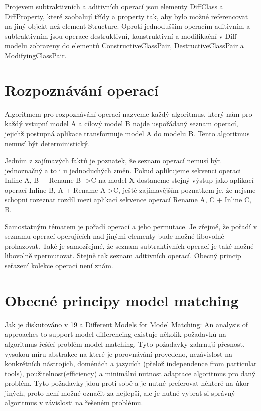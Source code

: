 \documentclass[11pt,twoside,a4paper]{book}
\begin{document}
 Projevem subtraktivních a aditivních operací jsou elementy DiffClass a
 DiffProperty, které zaobalují třídy a property tak, aby bylo možné referencovat
 na jiný objekt než element Structure. Oproti jednodušším operacím aditivním a
 subtraktivním jsou operace destruktivní, konstruktivní a modifikační v Diff
 modelu zobrazeny do elementů ConstructiveClassPair, DestructiveClassPair a
 ModifyingClassPair. 

\section{Rozpoznávání operací}

Algoritmem pro rozpoznávání operací nazveme každý algoritmus, který nám pro
každý vstupní model A a cílový model B najde uspořádaný seznam operací, jejichž
postupná aplikace transformuje model A do modelu B. Tento algoritmus nemusí být
deterministický.

Jedním z zajímavých faktů je poznatek, že seznam operací nemusí být jednoznačný
a to i u jednoduchých změn. Pokud aplikujeme sekvenci operaci Inline A, B + 
Rename B ->C na model X dostaneme stejný výstup jako aplikací operací Inline B,
A + Rename A->C, ještě zajímavějším poznatkem je, že nejsme schopni rozeznat
rozdíl mezi aplikací sekvence operací Rename A, C + Inline C, B.

Samostatným tématem je pořadí operací a jeho permutace. Je zřejmé, že pořadí v
seznamu operací operujících nad jinými elementy bude možné libovolně prohazovat.
Také je samozřejmé, že seznam subtraktivních operací je také možné libovolně
zpermutovat. Stejně tak seznam aditivních operací. Obecný princip seřazení kolekce 
operací není znám.

\section{Obecné principy model matching}
Jak je diskutováno v 19 a Different Models for Model Matching:
An analysis of approaches to support model differencing existuje několik
požadavků na algoritmus řešící problém model matching. Tyto požadavky zahrnují
přesnost, vysokou míru abstrakce na které je porovnávání provedeno, nezávislost
na konkrétních nástrojích, doménách a jazycích (přelož independence from
particular tools), použitelnost(efficiency) a minimální nutnost adaptace
algoritmus pro daný problém. Tyto požadavky jdou proti sobě a je nutné
preferovat některé na úkor jiných, proto není možné označit za nejlepší, ale je
nutné vybrat si správný algoritmus v závislosti na řešeném problému.
\end{document}
